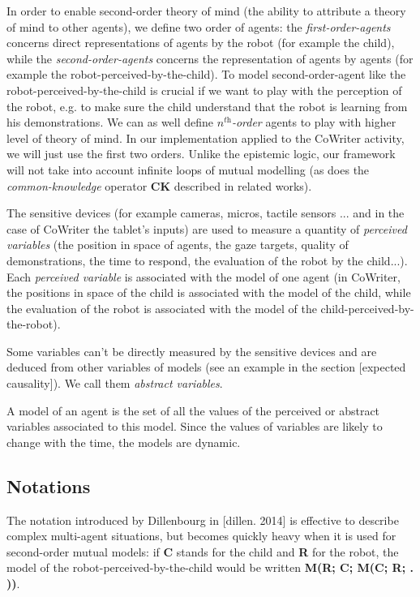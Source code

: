\documentclass[10pt,a4paper,twocolumn]{article}
\begin{document}
In order to enable second-order theory of mind (the ability to attribute a theory of mind to other agents), we define two order of agents: the \textit{first-order-agents} concerns direct representations of agents by the robot (for example the child), while the \textit{second-order-agents} concerns the representation of agents by agents (for example the robot-perceived-by-the-child). To model second-order-agent like the robot-perceived-by-the-child is crucial if we want to play with the perception of the robot, e.g. to make sure the child understand that the robot is learning from his demonstrations. We can as well define \textit{$n^{\textit{th}}$-order} agents to play with higher level of theory of mind. In our implementation applied to the CoWriter activity, we will just use the first two orders. Unlike the epistemic logic, our framework will not take into account infinite loops of mutual modelling (as does the \textit{common-knowledge} operator \textbf{CK} described in related works). 

The sensitive devices (for example cameras, micros, tactile sensors ... and in the case of CoWriter the tablet's inputs) are used to measure a quantity of \textit{perceived variables} (the position in space of agents, the gaze targets, quality of demonstrations, the time to respond, the evaluation of the robot by the child...). Each \textit{perceived variable} is associated with the model of one agent (in CoWriter, the positions in space of the child is associated with the model of the child, while the evaluation of the robot is associated with the model of the child-perceived-by-the-robot). 

Some variables can't be directly measured by the sensitive devices and are deduced from other variables of models (see an example in the section [expected causality]). We call them \textit{abstract variables}. 

A model of an agent is the set of all the values of the perceived or abstract variables associated to this model. Since the values of variables are likely to change with the time, the models are dynamic.

\subsection{Notations}

The notation introduced by Dillenbourg in [dillen. 2014] is effective to describe complex multi-agent situations, but becomes quickly heavy when it is used for second-order mutual models: if \textbf{C} stands for the child and \textbf{R} for the robot, the model of the robot-perceived-by-the-child would be written \textbf{M(R; C; M(C; R; . ))}.
\end{document}
